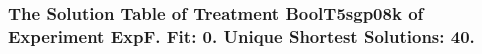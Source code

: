  \begin{frame}
 \fontsize{8pt}{9pt}\selectfont
 \frametitle{ The Solution Table of Treatment BoolT5sgp08k of Experiment ExpF. Fit: 0. Unique Shortest Solutions: 40. }

 \label{ExpFSolutionTable006.tex}  
 \end{frame}

